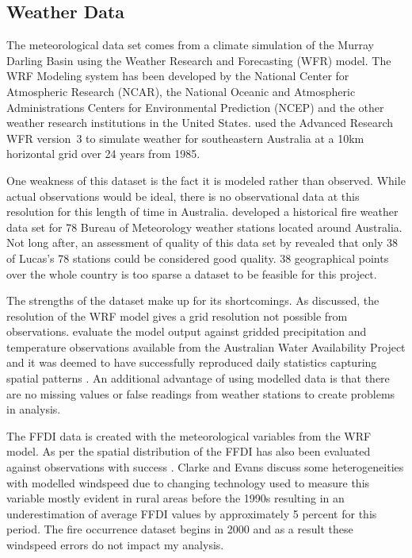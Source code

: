 \documentclass[11pt,a4paper]{article}
\begin{document}
\subsection{Weather Data}

The meteorological data set comes from a climate simulation of the Murray Darling Basin using the Weather Research and Forecasting (WFR) model. The WRF Modeling system has been developed by the National Center for Atmospheric Research (NCAR), the National Oceanic and Atmospheric Administrations Centers for Environmental Prediction (NCEP) and the other weather research institutions in the United States. \citet{evans10} used the Advanced Research WFR version~3 \citep{skamarock08} to simulate weather for southeastern Australia at a 10km horizontal grid over 24 years from 1985.

One weakness of this dataset is the fact it is modeled rather than observed. While actual observations would be ideal, there is no observational data at this resolution for this length of time in Australia. \citet{lucas10} developed a historical fire weather data set for 78 Bureau of Meteorology weather stations located around Australia. Not long after, an assessment of quality of this data set by \citet{clarke2013} revealed that only 38 of Lucas's 78 stations could be considered good quality. 38 geographical points over the whole country is too sparse a dataset to be feasible for this project.

The strengths of the dataset make up for its shortcomings. As discussed, the resolution of the WRF model gives a grid resolution not possible from observations. \citet{evans10} evaluate the model output against gridded precipitation and temperature observations available from the Australian Water Availability Project and it was deemed to have successfully reproduced daily statistics capturing spatial patterns  \citep{evans10, clarkeevans13}. An additional advantage of using modelled data is that there are no missing values or false readings from weather stations to create problems in analysis.

The FFDI data is created with the meteorological variables from the WRF model. As per \citet{clarkeevans13} the spatial distribution of the FFDI has also been evaluated against observations with success  \citep{sanabria13}. Clarke and Evans discuss some heterogeneities with modelled windspeed due to changing technology used to measure this variable mostly evident in rural areas before the 1990s resulting in an underestimation of average FFDI values by approximately 5 percent for this period. The fire occurrence dataset begins in 2000 and as a result these windspeed errors do not impact my analysis.
\end{document}
